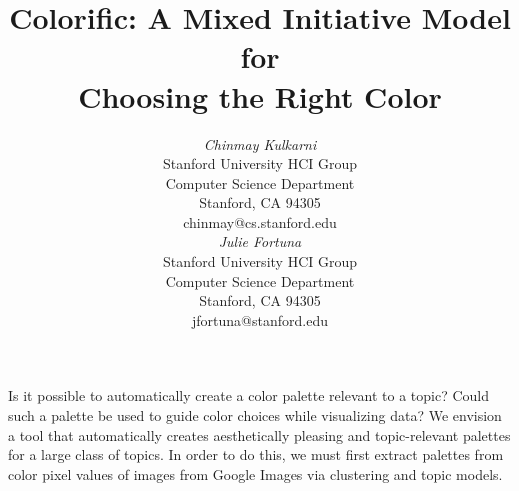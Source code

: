 \documentclass{article}
\begin{document}

 \toappear{}


\title{Colorific: A Mixed Initiative Model for \\Choosing the Right Color}


\author{
\parbox[t]{9cm}{\centering
	     {\em Chinmay Kulkarni}\\
	     Stanford University HCI Group\\
              Computer Science Department\\
	     Stanford, CA 94305\\
	     chinmay@cs.stanford.edu}
\parbox[t]{9cm}{\centering
	     {\em Julie Fortuna}\\
	     Stanford University HCI Group\\
              Computer Science Department\\
	     Stanford, CA 94305\\
	     jfortuna@stanford.edu}
}

\maketitle

\abstract
Is it possible to automatically create a color palette relevant to a topic? Could such a palette be used to guide color choices while visualizing data? We envision a tool that automatically creates aesthetically pleasing and topic-relevant palettes for a  large class of topics. In order to do this, we must first extract palettes from color pixel values of images from Google Images via clustering and topic models. 

\end{document}
